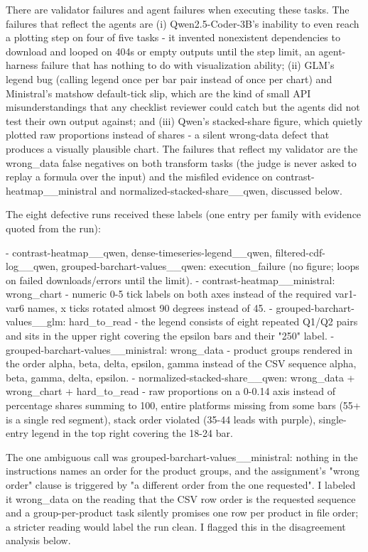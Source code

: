 \documentclass[11pt]{article}
\begin{document}
There are validator failures and agent failures when executing these tasks. The failures that reflect the agents are (i) Qwen2.5-Coder-3B's inability to even reach a plotting step on four of five tasks - it invented nonexistent dependencies to download and looped on 404s or empty outputs until the step limit, an agent-harness failure that has nothing to do with visualization ability; (ii) GLM's legend bug (calling legend once per bar pair instead of once per chart) and Ministral's matshow default-tick slip, which are the kind of small API misunderstandings that any checklist reviewer could catch but the agents did not test their own output against; and (iii) Qwen's stacked-share figure, which quietly plotted raw proportions instead of shares - a silent wrong-data defect that produces a visually plausible chart. The failures that reflect my validator are the wrong_data false negatives on both transform tasks (the judge is never asked to replay a formula over the input) and the misfiled evidence on contrast-heatmap__ministral and normalized-stacked-share__qwen, discussed below.

The eight defective runs received these labels (one entry per family with evidence quoted from the run):

- contrast-heatmap__qwen, dense-timeseries-legend__qwen, filtered-cdf-log__qwen, grouped-barchart-values__qwen: execution_failure (no figure; loops on failed downloads/errors until the limit).
- contrast-heatmap__ministral: wrong_chart - numeric 0-5 tick labels on both axes instead of the required var1-var6 names, x ticks rotated almost 90 degrees instead of 45.
- grouped-barchart-values__glm: hard_to_read - the legend consists of eight repeated Q1/Q2 pairs and sits in the upper right covering the epsilon bars and their "250" label.
- grouped-barchart-values__ministral: wrong_data - product groups rendered in the order alpha, beta, delta, epsilon, gamma instead of the CSV sequence alpha, beta, gamma, delta, epsilon.
- normalized-stacked-share__qwen: wrong_data + wrong_chart + hard_to_read - raw proportions on a 0-0.14 axis instead of percentage shares summing to 100, entire platforms missing from some bars (55+ is a single red segment), stack order violated (35-44 leads with purple), single-entry legend in the top right covering the 18-24 bar.

The one ambiguous call was grouped-barchart-values__ministral: nothing in the instructions names an order for the product groups, and the assignment's "wrong order" clause is triggered by "a different order from the one requested". I labeled it wrong_data on the reading that the CSV row order is the requested sequence and a group-per-product task silently promises one row per product in file order; a stricter reading would label the run clean. I flagged this in the disagreement analysis below.
\end{document}
